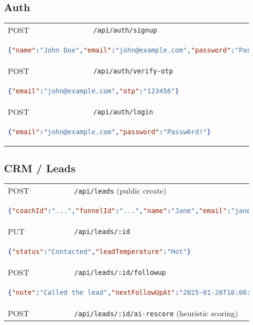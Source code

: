 \documentclass[11pt,a4paper]{article}
\begin{document}
\subsection{Auth}
\begin{longtable}{p{2.5cm}p{10cm}}
POST & \texttt{/api/auth/signup} \\
\multicolumn{2}{p{13cm}}{\begin{lstlisting}[language=json]
{"name":"John Doe","email":"john@example.com","password":"Passw0rd!","role":"coach"}
\end{lstlisting}} \\
POST & \texttt{/api/auth/verify-otp} \\
\multicolumn{2}{p{13cm}}{\begin{lstlisting}[language=json]
{"email":"john@example.com","otp":"123456"}
\end{lstlisting}} \\
POST & \texttt{/api/auth/login} \\
\multicolumn{2}{p{13cm}}{\begin{lstlisting}[language=json]
{"email":"john@example.com","password":"Passw0rd!"}
\end{lstlisting}} \\
\end{longtable}

\subsection{CRM / Leads}
\begin{longtable}{p{2.5cm}p{10cm}}
POST & \texttt{/api/leads} (public create) \\
\multicolumn{2}{p{13cm}}{\begin{lstlisting}[language=json]
{"coachId":"...","funnelId":"...","name":"Jane","email":"jane@ex.com","phone":"+11234567890","source":"Web Form"}
\end{lstlisting}} \\
PUT & \texttt{/api/leads/:id} \\
\multicolumn{2}{p{13cm}}{\begin{lstlisting}[language=json]
{"status":"Contacted","leadTemperature":"Hot"}
\end{lstlisting}} \\
POST & \texttt{/api/leads/:id/followup} \\
\multicolumn{2}{p{13cm}}{\begin{lstlisting}[language=json]
{"note":"Called the lead","nextFollowUpAt":"2025-01-20T10:00:00Z"}
\end{lstlisting}} \\
POST & \texttt{/api/leads/:id/ai-rescore} (heuristic scoring) \\
\end{longtable}
\end{document}
